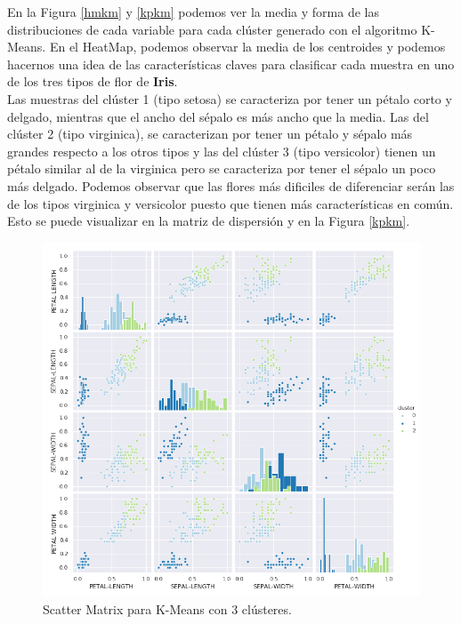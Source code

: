 \documentclass[a4paper, 20pt]{article}
\begin{document}
En la Figura \ref{hmkm} y \ref{kpkm} podemos ver la media y forma de las distribuciones de cada variable para cada clúster generado con el algoritmo K-Means. En el HeatMap, podemos observar la media de los centroides y podemos hacernos una idea de las características claves para clasificar cada muestra en uno de los tres tipos de flor de \textbf{Iris}.\\

Las muestras del clúster 1 (tipo setosa) se caracteriza por tener un pétalo corto y delgado, mientras que el ancho del sépalo es más ancho que la media. Las del clúster 2 (tipo virginica), se caracterizan por tener un pétalo y sépalo más grandes respecto a los otros tipos y las del clúster 3 (tipo versicolor) tienen un pétalo similar al de la virginica pero se caracteriza por tener el sépalo un poco más delgado. Podemos observar que las flores más dificiles de diferenciar serán las de los tipos virginica y versicolor puesto que tienen más características en común. Esto se puede visualizar en la matriz de dispersión y en la Figura \ref{kpkm}.

\clearpage

\begin{figure}[h]
\centering
\includegraphics[scale=0.63]{dani/scatmatrixK-MeansIRIS.png}
\caption{Scatter Matrix para K-Means con 3 clústeres.}
\label{smkm}
\end{figure}\
\end{document}
